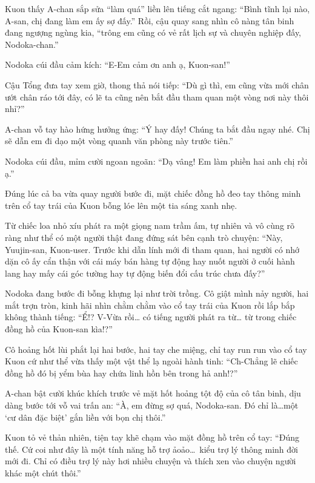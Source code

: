 \documentclass[../main.tex]{subfiles}
\begin{document}
Kuon thấy A-chan sắp sửa ``làm quá'' liền lên tiếng cắt ngang: ``Bình tĩnh lại nào, A-san, chị đang làm em ấy sợ đấy.'' Rồi, cậu quay sang nhìn cô nàng tân binh đang ngượng ngùng kia, ``trông em cũng có vẻ rất lịch sự và chuyên nghiệp đấy, Nodoka-chan.''

Nodoka cúi đầu cảm kích: ``E-Em cảm ơn anh ạ, Kuon-san!''

Cậu Tổng đưa tay xem giờ, thong thả nói tiếp: ``Dù gì thì, em cũng vừa mới chân ướt chân ráo tới đây, có lẽ ta cũng nên bắt đầu tham quan một vòng nơi này thôi nhỉ?''

A-chan vỗ tay hào hứng hưởng ứng: ``Ý hay đấy! Chúng ta bắt đầu ngay nhé. Chị sẽ dẫn em đi dạo một vòng quanh văn phòng này trước tiên.''

Nodoka cúi đầu, mỉm cười ngoan ngoãn: ``Dạ vâng! Em làm phiền hai anh chị rồi ạ.''

Đúng lúc cả ba vừa quay người bước đi, mặt chiếc đồng hồ đeo tay thông minh trên cổ tay trái của Kuon bỗng lóe lên một tia sáng xanh nhẹ.

Từ chiếc loa nhỏ xíu phát ra một giọng nam trầm ấm, tự nhiên và vô cùng rõ ràng như thể có một người thật đang đứng sát bên cạnh trò chuyện: ``Này, Yuujin-san, Kuon-user. Trước khi dẫn lính mới đi tham quan, hai người có nhớ dặn cô ấy cẩn thận với cái máy bán hàng tự động hay nuốt người ở cuối hành lang hay mấy cái góc tường hay tự động biến đổi cấu trúc chưa đấy?''

Nodoka đang bước đi bỗng khựng lại như trời trồng. Cô giật mình nảy người, hai mắt trợn tròn, kinh hãi nhìn chằm chằm vào cổ tay trái của Kuon rồi lắp bắp không thành tiếng: ``Ể!? V-Vừa rồi… có tiếng người phát ra từ… từ trong chiếc đồng hồ của Kuon-san kìa!?''

Cô hoảng hốt lùi phắt lại hai bước, hai tay che miệng, chỉ tay run run vào cổ tay Kuon cứ như thể vừa thấy một vật thể lạ ngoài hành tinh: ``Ch-Chẳng lẽ chiếc đồng hồ đó bị yểm bùa hay chứa linh hồn bên trong hả anh!?''

A-chan bật cười khúc khích trước vẻ mặt hốt hoảng tột độ của cô tân binh, dịu dàng bước tới vỗ vai trấn an: ``À, em đừng sợ quá, Nodoka-san. Đó chỉ là\dots một `cư dân đặc biệt' gắn liền với bọn chị thôi.''

Kuon tỏ vẻ thản nhiên, tiện tay khẽ chạm vào mặt đồng hồ trên cổ tay: ``Đúng thế. Cứ coi như đây là một tính năng hỗ trợ ảoảo\dots\ kiểu trợ lý thông minh đời mới đi. Chỉ có điều trợ lý này hơi nhiều chuyện và thích xen vào chuyện người khác một chút thôi.''
\end{document}
